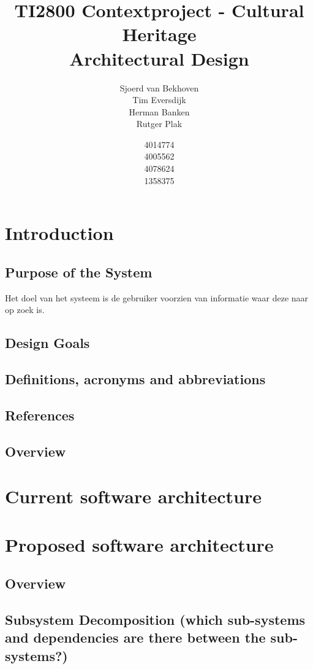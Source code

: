 \documentclass{article}
\begin{document}
\title{TI2800 Contextproject - Cultural Heritage \\ Architectural Design}
\author{Sjoerd van Bekhoven \\ Tim Eversdijk \\ Herman Banken \\ Rutger Plak \and 4014774 \\ 4005562 \\ 4078624 \\ 1358375}
\maketitle

\section{Introduction}
\subsection{Purpose of the System}
Het doel van het systeem is de gebruiker voorzien van informatie waar deze naar op zoek is. 
\subsection{Design Goals}
\subsection{Definitions, acronyms and abbreviations}
\subsection{References}
\subsection{Overview}
\section{Current software architecture}
\section{Proposed software architecture}
\subsection{Overview}
\subsection{Subsystem Decomposition (which sub-systems and dependencies are there
between the sub-systems?)}
\end{document}
